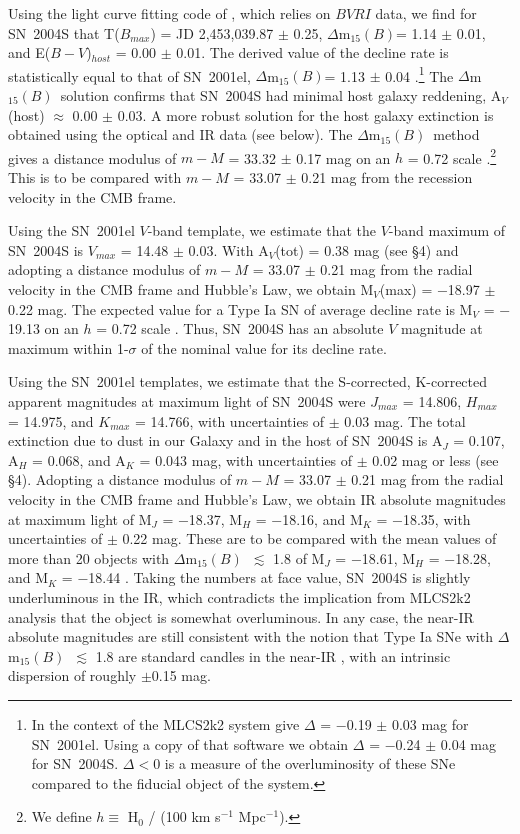 \documentclass[12pt,preprint,psfig,epsf]{aastex}
\newcommand{\dmm}{\mbox{$\Delta$m$_{15}(B)$}}
\newcommand{\bvri}{\protect\hbox{$BV\!RI$} }
\begin{document}
Using the light curve fitting code of \citet{Pri_etal06}, which relies on \bvri data, we find
for SN~2004S that T($B_{max}$) = JD 2,453,039.87 $\pm$ 0.25, \dmm = 1.14 $\pm$ 0.01, and
E($B-V$)$_{host}$ = 0.00 $\pm$ 0.01.  The derived value of the decline rate is statistically
equal to that of SN~2001el, \dmm = 1.13 $\pm$ 0.04 
\citep{Kri_etal03}.\footnote[17]{In the context of the MLCS2k2 system \citet{Jha_etal06b}
give $\Delta$ = $-$0.19 $\pm$ 0.03 mag for SN~2001el.  Using a copy of that software we
obtain $\Delta$ = $-$0.24 $\pm$ 0.04 mag for SN~2004S.  $\Delta < 0$ is a measure
of the overluminosity of these SNe compared to the fiducial object of the system. }  
The \dmm\ solution confirms that SN~2004S had minimal host galaxy
reddening, A$_V$(host) $\approx$ 0.00 $\pm$ 0.03. A more robust solution for the host galaxy
extinction is obtained using the optical and IR data (see below). The \dmm\ method gives a
distance modulus of $m-M$ = 33.32 $\pm$ 0.17 mag on an $h$ = 0.72 scale
\citep{Fre_etal01}.\footnote[18]{We define $h \equiv$ H$_0$ / (100 km s$^{-1}$ 
Mpc$^{-1}$).}
This is to be compared with $m-M$ = 33.07 $\pm$ 0.21 mag from the recession velocity in the
CMB frame.

Using the SN~2001el $V$-band template, we estimate that the $V$-band maximum of
SN~2004S is $V_{max}$ = 14.48 $\pm$ 0.03.  With A$_V$(tot) = 0.38 mag (see \S4)
and adopting a distance modulus of $m-M$ = 33.07 $\pm$ 0.21 mag from the radial
velocity in the CMB frame and Hubble's Law, we obtain M$_V$(max) = $-$18.97 $\pm$
0.22 mag. The expected value for a Type Ia SN of average decline rate is M$_V$ =
$-$19.13 on an $h$ = 0.72 scale \citep{Phi_etal99}.  Thus, SN~2004S has an
absolute $V$ magnitude at maximum within 1-$\sigma$ of the nominal value for its
decline rate.

Using the SN~2001el templates, we estimate that the S-corrected, K-corrected
apparent magnitudes at maximum light of SN~2004S were $J_{max}$ = 14.806,
$H_{max}$ = 14.975, and $K_{max}$ = 14.766, with uncertainties of $\pm$ 0.03 mag.  
The total extinction due to dust in our Galaxy and in the host of SN~2004S is
A$_J$ = 0.107, A$_H$ = 0.068, and A$_K$ = 0.043 mag, with uncertainties of $\pm$
0.02 mag or less (see \S4). Adopting a distance modulus of $m-M$ = 33.07 $\pm$ 0.21 mag
from the radial velocity in the CMB frame and Hubble's Law, we obtain IR absolute
magnitudes at maximum light of M$_J$ = $-$18.37, M$_H$ = $-$18.16, and M$_K$ =
$-$18.35, with uncertainties of $\pm$ 0.22 mag.  These are to be compared with
the mean values of more than 20 objects with \dmm\ $\lesssim$ 1.8 of M$_J$ =
$-$18.61, M$_H$ = $-$18.28, and M$_K$ = $-$18.44 \citep[][Table 17]{Kri_etal04c}.  
Taking the numbers at face value, SN~2004S is slightly underluminous in the IR,
which contradicts the implication from MLCS2k2 analysis that the object is 
somewhat overluminous.  In any case, the near-IR absolute magnitudes are
still consistent with the notion that Type Ia SNe with \dmm\
$\lesssim$ 1.8 are standard candles in the near-IR \citep{Kri_etal04a}, with an
intrinsic dispersion of roughly $\pm$0.15 mag.
\end{document}
